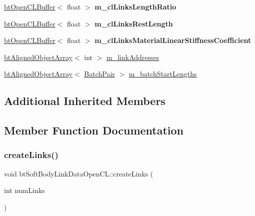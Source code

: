 \begin{DoxyCompactItemize}
\hyperlink{classbtOpenCLBuffer}{bt\+Open\+C\+L\+Buffer}$<$ float $>$ {\bfseries m\+\_\+cl\+Links\+Length\+Ratio}
\item 
\mbox{\label{classbtSoftBodyLinkDataOpenCL_aae4d0a711011724a320bac69115847c1}} 
\hyperlink{classbtOpenCLBuffer}{bt\+Open\+C\+L\+Buffer}$<$ float $>$ {\bfseries m\+\_\+cl\+Links\+Rest\+Length}
\item 
\mbox{\label{classbtSoftBodyLinkDataOpenCL_a17d6cca6e5d5c19a671d26615d3ff09f}} 
\hyperlink{classbtOpenCLBuffer}{bt\+Open\+C\+L\+Buffer}$<$ float $>$ {\bfseries m\+\_\+cl\+Links\+Material\+Linear\+Stiffness\+Coefficient}
\item 
\hyperlink{classbtAlignedObjectArray}{bt\+Aligned\+Object\+Array}$<$ int $>$ \hyperlink{classbtSoftBodyLinkDataOpenCL_a0e7f46fa09dc03865495188be20fe1d4}{m\+\_\+link\+Addresses}
\item 
\hyperlink{classbtAlignedObjectArray}{bt\+Aligned\+Object\+Array}$<$ \hyperlink{structbtSoftBodyLinkDataOpenCL_1_1BatchPair}{Batch\+Pair} $>$ \hyperlink{classbtSoftBodyLinkDataOpenCL_a112ca944380e035211dc6184a9f04312}{m\+\_\+batch\+Start\+Lengths}
\end{DoxyCompactItemize}
\subsection*{Additional Inherited Members}


\subsection{Member Function Documentation}
\mbox{\label{classbtSoftBodyLinkDataOpenCL_a3ebb411d58ecebab84e391588f20204f}} 
\subsubsection{\texorpdfstring{create\+Links()}{createLinks()}\hspace{0.1cm}{\footnotesize\ttfamily [1/2]}}
{\footnotesize\ttfamily void bt\+Soft\+Body\+Link\+Data\+Open\+C\+L\+::create\+Links (\begin{DoxyParamCaption}\item[{int}]{num\+Links }\end{DoxyParamCaption})\hspace{0.3cm}{\ttfamily [virtual]}}

